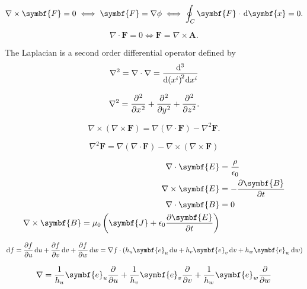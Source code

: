 \begin{equation*}
	\nabla\times\symbf{F}=
	0\iff
	\symbf{F}=
	\nabla\phi\iff
	\oint_{C}
	\symbf{F}\cdot\dl{\symbf{x}}=
	0.
\end{equation*}

\begin{equation*}
	\nabla\cdot\symbf{F}=0\iff
	\symbf{F}=\nabla\times\symbf{A}.
\end{equation*}

The Laplacian is a second order differential operator defined by
\begin{equation*}
	\nabla^{2}=
	\nabla\cdot\nabla=
	\diff[2]{}{x^{i},x^{i}}
\end{equation*}

\begin{equation*}
	\nabla^{2}=
	\diffp[2]{}{x}+
	\diffp[2]{}{y}+
	\diffp[2]{}{z}.
\end{equation*}

\begin{equation*}
	\nabla\times\left(\nabla\times\symbf{F}\right)=
	\nabla\left(\nabla\cdot\symbf{F}\right)-\nabla^{2}\symbf{F}.
\end{equation*}

\begin{equation*}
	\nabla^{2}\symbf{F}=
	\nabla\left(\nabla\cdot\symbf{F}\right)-\nabla\times\left(\nabla\times\symbf{F}\right)
\end{equation*}

\begin{align*}
	\nabla\cdot\symbf{E}  & =\frac{\rho}{\epsilon_{0}} \\
	\nabla\times\symbf{E} & =-\diffp{\symbf{B}}{t}     \\
	\nabla\cdot\symbf{B}  & =0                         \\
	\nabla\times\symbf{B}=
	\mu_{0}\left(\symbf{J}+\epsilon_{0}\diffp{\symbf{E}}{t}\right)
\end{align*}

\begin{equation*}
	\dl f=
	\diffp{f}{u}\dl u+
	\diffp{f}{v}\dl v+
	\diffp{f}{w}\dl w=
	\nabla f\cdot
	\left(
	h_{u}\symbf{e}_{u}\dl u+
	h_{v}\symbf{e}_{v}\dl v+
	h_{w}\symbf{e}_{w}\dl w
	\right)
\end{equation*}

\begin{equation*}
	\nabla=
	\frac{1}{h_{u}}\symbf{e}_{u}\diffp{}{u}+
	\frac{1}{h_{v}}\symbf{e}_{v}\diffp{}{v}+
	\frac{1}{h_{w}}\symbf{e}_{w}\diffp{}{w}
\end{equation*}

